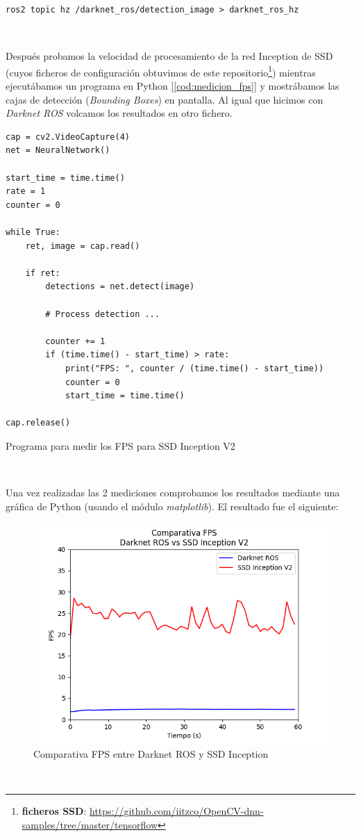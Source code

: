 \begin{lstlisting}
ros2 topic hz /darknet_ros/detection_image > darknet_ros_hz
\end{lstlisting}\

Después probamos la velocidad de procesamiento de la red Inception de SSD (cuyos ficheros de configuración obtuvimos de este repositorio\footnote{\textbf{ficheros SSD}: \url{https://github.com/iitzco/OpenCV-dnn-samples/tree/master/tensorflow}}) mientras ejecutábamos un programa en Python [\ref{cod:medicion_fps}] y mostrábamos las cajas de detección (\textit{Bounding Boxes}) en pantalla. Al igual que hicimos con \textit{Darknet ROS} volcamos los resultados en otro fichero.\\

\begin{code}[H]
\begin{lstlisting}
cap = cv2.VideoCapture(4)
net = NeuralNetwork()

start_time = time.time()
rate = 1
counter = 0

while True:
	ret, image = cap.read()
	
	if ret:
		detections = net.detect(image)
		
		# Process detection ...

		counter += 1
		if (time.time() - start_time) > rate:
			print("FPS: ", counter / (time.time() - start_time))
			counter = 0
			start_time = time.time()

cap.release()
\end{lstlisting}
\caption{Programa para medir los FPS para SSD Inception V2}
\label{cod:medicion_fps}
\end{code}\

Una vez realizadas las 2 mediciones comprobamos los resultados mediante una gráfica de Python (usando el módulo \textit{matplotlib}). El resultado fue el siguiente:

\begin{figure} [H]
  \begin{center}
    \includegraphics[width=12cm]{imagenes/cap5/comparativa-fps-models.png}
  \end{center}
  \caption[Comparativa FPS entre Darknet ROS y SSD Inception]{Comparativa FPS entre Darknet ROS y SSD Inception}
  \label{fig:comparativa_fps_models}
\end{figure}\

